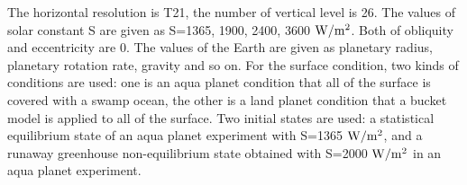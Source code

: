 \documentclass[dvipdfmx,twocolumn,10pt]{jsarticle}
\begin{document}
The horizontal resolution is T21, the number of vertical level is 26. 
The values of solar constant S are given as S=1365, 1900, 2400, 3600 $\rm{W/m^{2}}$. 
Both of obliquity and eccentricity are 0. 
The values of the Earth are given as planetary radius, planetary rotation rate, gravity and so on. 
For the surface condition, two kinds of conditions are used:
one is an aqua planet condition that all of the surface is covered with a swamp ocean, 
the other is a land planet condition that a bucket model is applied to all of the surface. 
Two initial states are used:
a statistical equilibrium state of an aqua planet experiment with S=1365 $\rm{W/m^{2}}$, 
and a runaway greenhouse non-equilibrium state obtained with S=2000 $\rm{W/m^{2}}$ in an aqua planet experiment. 

\vspace{-0.2zh}
\end{document}
